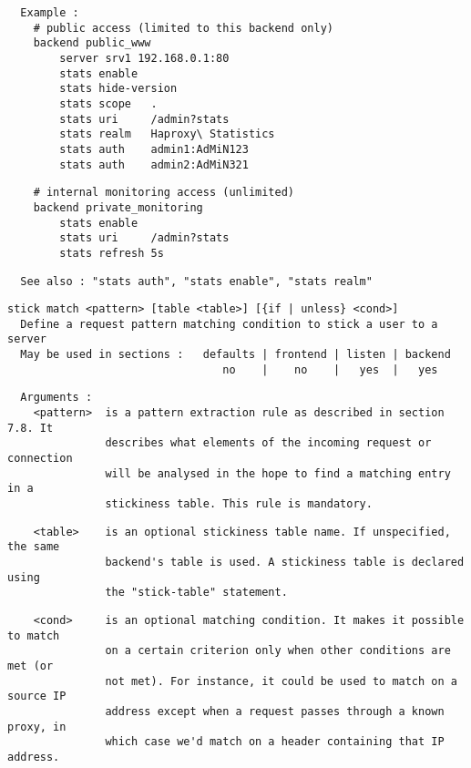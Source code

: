 \begin{verbatim}
  Example :
    # public access (limited to this backend only)
    backend public_www
        server srv1 192.168.0.1:80
        stats enable
        stats hide-version
        stats scope   .
        stats uri     /admin?stats
        stats realm   Haproxy\ Statistics
        stats auth    admin1:AdMiN123
        stats auth    admin2:AdMiN321
\end{verbatim}

\begin{verbatim}
    # internal monitoring access (unlimited)
    backend private_monitoring
        stats enable
        stats uri     /admin?stats
        stats refresh 5s
\end{verbatim}

\begin{verbatim}
  See also : "stats auth", "stats enable", "stats realm"
\end{verbatim}

\begin{verbatim}
stick match <pattern> [table <table>] [{if | unless} <cond>]
  Define a request pattern matching condition to stick a user to a server
  May be used in sections :   defaults | frontend | listen | backend
                                 no    |    no    |   yes  |   yes
\end{verbatim}

\begin{verbatim}
  Arguments :
    <pattern>  is a pattern extraction rule as described in section 7.8. It
               describes what elements of the incoming request or connection
               will be analysed in the hope to find a matching entry in a
               stickiness table. This rule is mandatory.
\end{verbatim}

\begin{verbatim}
    <table>    is an optional stickiness table name. If unspecified, the same
               backend's table is used. A stickiness table is declared using
               the "stick-table" statement.
\end{verbatim}

\begin{verbatim}
    <cond>     is an optional matching condition. It makes it possible to match
               on a certain criterion only when other conditions are met (or
               not met). For instance, it could be used to match on a source IP
               address except when a request passes through a known proxy, in
               which case we'd match on a header containing that IP address.
\end{verbatim}

